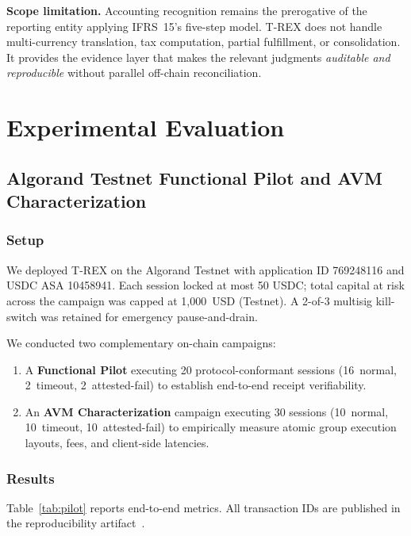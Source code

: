 \documentclass[journal]{IEEEtran}
\begin{document}
\noindent\textbf{Scope limitation.}
Accounting recognition remains the prerogative of the reporting
entity applying IFRS~15's five-step model.
T-REX does not handle multi-currency translation, tax computation,
partial fulfillment, or consolidation.
It provides the evidence layer that makes the relevant judgments
\emph{auditable and reproducible} without parallel off-chain
reconciliation.

\section{Experimental Evaluation}
\label{sec:evaluation}

\subsection{Algorand Testnet Functional Pilot and AVM
Characterization}
\label{sec:pilot}

\subsubsection{Setup}
We deployed T-REX on the Algorand Testnet with application ID
769248116 and USDC ASA 10458941.
Each session locked at most 50 USDC; total capital at risk across
the campaign was capped at 1{,}000~USD (Testnet).
A 2-of-3 multisig kill-switch was retained for emergency
pause-and-drain.

We conducted two complementary on-chain campaigns:
\begin{enumerate}[label=(\roman*),leftmargin=*]
\item A \textbf{Functional Pilot} executing 20 protocol-conformant
sessions (16~normal, 2~timeout, 2~attested-fail) to establish
end-to-end receipt verifiability.
\item An \textbf{AVM Characterization} campaign executing 30
sessions (10~normal, 10~timeout, 10~attested-fail) to empirically
measure atomic group execution layouts, fees, and client-side
latencies.
\end{enumerate}

\subsubsection{Results}
Table~\ref{tab:pilot} reports end-to-end metrics.
All transaction IDs are published in the reproducibility
artifact~\cite{artifact}.
\end{document}
